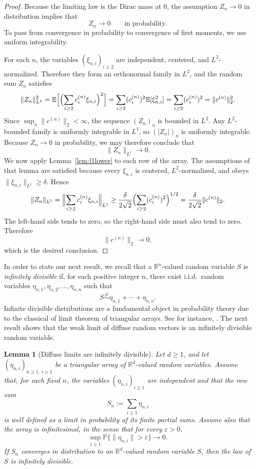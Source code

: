 \documentclass[11pt]{amsart}
\numberwithin{equation}{section}
\newtheorem{lemma}[theorem]{Lemma}
\theoremstyle{definition}
\theoremstyle{remark}
\newcommand{\E}{\mathbb E}
\newcommand{\Prob}{\mathbb P}
\newcommand{\R}{\mathbb R}
\newcommand{\eps}{\varepsilon}
\newcommand{\norm}[1]{\lVert #1 \rVert}
\begin{document}
\begin{proof}
Because the limiting law is the Dirac mass at $0$, the assumption
$Z_n\to0$ in distribution implies that
\[
Z_n\to0
\qquad\text{in probability.}
\]
To pass from convergence in probability to convergence of first moments, we use
uniform integrability.

For each $n$, the variables $(\xi_{n,i})_{i\ge2}$ are independent, centered,
and $L^2$-normalized.  Therefore they form an orthonormal family in $L^2$, and
the random sum $Z_n$ satisfies
\[
\norm{Z_n}_{L^2}^2
=\E\Bigl[\Bigl(\sum_{i\ge2} c_i^{(n)}\xi_{n,i}\Bigr)^2\Bigr]
=\sum_{i\ge2}(c_i^{(n)})^2\E[\xi_{n,i}^2]
=\sum_{i\ge2}(c_i^{(n)})^2
=\norm{c^{(n)}}_2^2.
\]
Since $\sup_n \norm{c^{(n)}}_2<\infty$, the sequence $(Z_n)_n$ is bounded in
$L^2$.  Any $L^2$-bounded family is uniformly integrable in $L^1$, so
$(|Z_n|)_n$ is uniformly integrable.  Because $Z_n\to0$ in probability, we may
therefore conclude that
\[
\norm{Z_n}_{L^1}\longrightarrow0.
\]
We now apply Lemma~\ref{lem:l1lower} to each row of the array.  The assumptions of
that lemma are satisfied because every $\xi_{n,i}$ is centered,
$L^2$-normalized, and obeys $\norm{\xi_{n,i}}_{L^1}\ge\delta$.  Hence
\[
\norm{Z_n}_{L^1}
=\Bigl\|\sum_{i\ge2} c_i^{(n)}\xi_{n,i}\Bigr\|_{L^1}
\ge
\frac{\delta}{2\sqrt2}
\Bigl(\sum_{i\ge2}(c_i^{(n)})^2\Bigr)^{1/2}
=\frac{\delta}{2\sqrt2}\norm{c^{(n)}}_2.
\]
The left-hand side tends to zero, so the right-hand side must also tend to
zero.  Therefore
\[
\norm{c^{(n)}}_2\longrightarrow0,
\]
which is the desired conclusion.
\end{proof}

In order to state our next result, we recall that a $\R^n$-valued random variable $S$ is \emph{infinitely divisible} if, for each positive integer $n$, there exist i.i.d.~random variables $\eta_{n,1},\eta_{n,2},\dots,\eta_{n,n}$ such that 
\[
S \overset{d}{\sim} \eta_{n,1} + \cdots + \eta_{n,n}. 
\]
Infinite divisible distributions are a fundamental object in probability theory due to the classical of limit theorem of triangular arrays. See for instance, \cite[Chapter~IV]{gnedenko-kolmogorov}.
The next result shows that the weak limit of diffuse random vectors is an infinitely divisible random variable. 

\begin{lemma}[Diffuse limits are infinitely divisible]\label{lem:diffuse-id-limit}
Let $d\ge1$, and let $(\eta_{n,i})_{n\ge1,\ i\ge1}$ be a triangular array of
$\R^d$-valued random variables.  Assume that, for each fixed $n$, the variables
$(\eta_{n,i})_{i\ge1}$ are independent and that the row sum
\[
S_n:=\sum_{i\ge1} \eta_{n,i}
\]
is well defined as a limit in probability of its finite partial sums.  Assume
also that the array is infinitesimal, in the sense that for every
$\eps>0$,
\[
\sup_{i\ge1}\Prob\{\norm{\eta_{n,i}}>\eps\}\longrightarrow0.
\]
If $S_n$ converges in distribution to an $\R^d$-valued random variable $S$,
then the law of $S$ is infinitely divisible.
\end{lemma}
\end{document}
